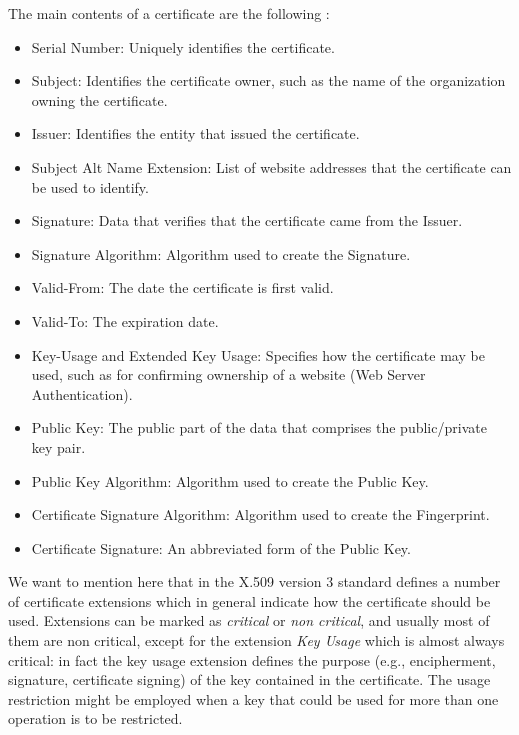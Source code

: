 \documentclass[11pt]{article}
\begin{document}
The main contents of a certificate are the following \cite{mozillasupport}:
\begin{itemize}
\item Serial Number: Uniquely identifies the certificate.
\item Subject: Identifies the certificate owner, such as the name of the organization owning the certificate.
\item Issuer: Identifies the entity that issued the certificate.
\item Subject Alt Name Extension: List of website addresses that the certificate can be used to identify.
\item Signature: Data that verifies that the certificate came from the Issuer.
\item Signature Algorithm: Algorithm used to create the Signature.
\item Valid-From: The date the certificate is first valid.
\item Valid-To: The expiration date.
\item Key-Usage and Extended Key Usage: Specifies how the certificate may be used, such as for confirming ownership of a website (Web Server Authentication).
\item Public Key: The public part of the data that comprises the public/private key pair.
\item Public Key Algorithm: Algorithm used to create the Public Key.
\item Certificate Signature Algorithm: Algorithm used to create the Fingerprint.
\item Certificate Signature: An abbreviated form of the Public Key.
\end{itemize}

We want to mention here that in the X.509 version 3 standard defines a number of certificate extensions which in general indicate how the certificate should be used. Extensions can be marked as \textit{critical} or \textit{non critical}, and usually most of them are non critical, except for the extension \textit{Key Usage} which is almost always critical: in fact the key usage extension defines the purpose (e.g., encipherment, signature, certificate signing) of the key contained in the certificate. The usage restriction might be employed when a key that could be used for more than one operation is to be restricted.
\end{document}
